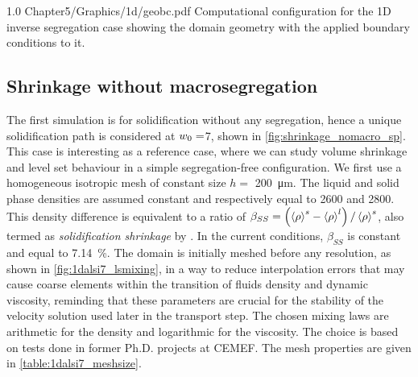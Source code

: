 \begin{figureth}
{1.0}
{Chapter5/Graphics/1d/geobc.pdf}
{Computational configuration for the 1D inverse segregation case showing the domain geometry with the applied boundary conditions to it.}
\label{fig:1d_alsi7_geobc}
\end{figureth}

%
\subsection{Shrinkage without macrosegregation}

The first simulation is for solidification without any segregation, hence a unique solidification path is considered at ${w}_0=$\SI{7}{\ucomposition},
shown in \cref{fig:shrinkage_nomacro_sp}.
This case is interesting as a reference case, where we can study volume shrinkage and level set behaviour in a simple segregation-free configuration.
We first use a homogeneous isotropic mesh of constant size $h=$ \SI{200}{\micro \metre}. The liquid and solid phase densities are assumed constant
and respectively equal to \SI{2600}{\udensity} and \SI{2800}{\udensity}. This density difference is equivalent to a ratio of $\beta_{SS}= \left( \left \langle \rho \right \rangle^s-\left \langle \rho \right \rangle^l \right)/\left \langle \rho \right \rangle^s$,
also termed as \emph{solidification shrinkage} by \citet{flemings_macrosegregation:_1967}. 
In the current conditions, $\beta_{SS}$ is constant and equal to \SI{7.14}{\percent}. 
The domain is initially meshed before any resolution, as shown in \cref{fig:1dalsi7_lsmixing}, in a way to reduce interpolation errors that may
cause coarse elements within the transition of fluids density and dynamic viscosity, reminding that these parameters are crucial for the stability 
of the velocity solution used later in the transport step. The chosen mixing laws are arithmetic for the density and logarithmic for the viscosity.
The choice is based on tests done in former Ph.D. projects at CEMEF. 
The mesh properties are given in \cref{table:1dalsi7_meshsize}.

